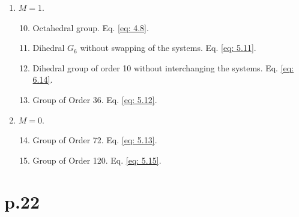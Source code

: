 \documentclass[leqno]{article}
\begin{document}
\begin{enumerate}[label=\alph*.]
\begin{enumerate}[label=\arabic*)]
    \end{enumerate}
    \item $M=1$. 
    \begin{enumerate}[label=\arabic*)]
    	\setcounter{enumii}{9}
    	\item Octahedral group. Eq. \eqref{eq: 4.8}. 
    	\item Dihedral $G_6$ without swapping of the systems. Eq. \eqref{eq: 5.11}.
    	\item Dihedral group of order 10 without interchanging the systems. Eq. \eqref{eq: 6.14}.
    	\item Group of Order 36. Eq. \eqref{eq: 5.12}.
    \end{enumerate}
    \item $M=0$. 
    \begin{enumerate}[label=\arabic*)]
    	\setcounter{enumii}{13}
    	\item Group of Order 72. Eq. \eqref{eq: 5.13}.   
    	\item Group of Order 120. Eq. \eqref{eq: 5.15}.
    \end{enumerate}
\end{enumerate}

\section{p.22}
\end{document}
